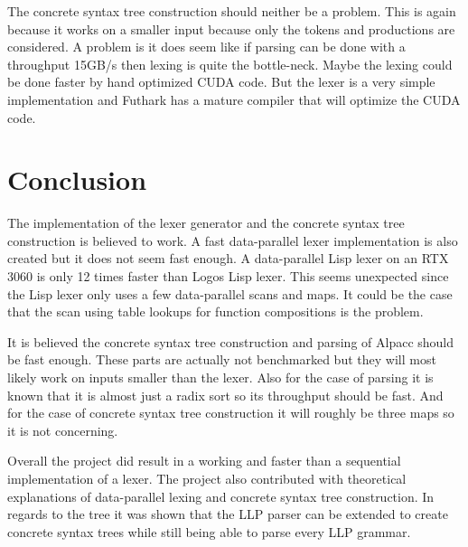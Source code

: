 \documentclass[a4paper,12pt]{article}
\theoremstyle{definition}
\begin{document}
The concrete syntax tree construction should neither be a problem. This is again because it works on a smaller input because only the tokens and productions are considered. A problem is it does seem like if parsing can be done with a throughput 15GB/s then lexing is quite the bottle-neck. Maybe the lexing could be done faster by hand optimized CUDA code. But the lexer is a very simple implementation and Futhark has a mature compiler that will optimize the CUDA code.

\section{Conclusion}
The implementation of the lexer generator and the concrete syntax tree construction is believed to work. A fast data-parallel lexer implementation is also created but it does not seem fast enough. A data-parallel Lisp lexer on an RTX 3060 is only 12 times faster than Logos Lisp lexer. This seems unexpected since the Lisp lexer only uses a few data-parallel scans and maps. It could be the case that the scan using table lookups for function compositions is the problem. 

It is believed the concrete syntax tree construction and parsing of Alpacc should be fast enough. These parts are actually not benchmarked but they will most likely work on inputs smaller than the lexer. Also for the case of parsing it is known that it is almost just a radix sort so its throughput should be fast. And for the case of concrete syntax tree construction it will roughly be three maps so it is not concerning.

Overall the project did result in a working and faster than a sequential implementation of a lexer. The project also contributed with theoretical explanations of data-parallel lexing and concrete syntax tree construction. In regards to the tree it was shown that the LLP parser can be extended to create concrete syntax trees while still being able to parse every LLP grammar. 

\newpage
\printbibliography
\end{document}
